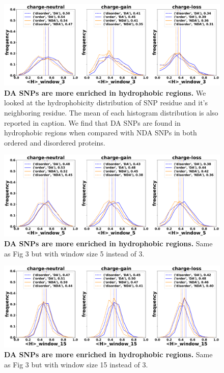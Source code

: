 \documentclass[10pt,letterpaper]{article}
\begin{document}
\begin{figure}[!ht]
\includegraphics[scale=0.1,width=\textwidth,trim={0 0cm 0 0cm},clip]{./figures/snp_hydropathy_distribution_3.pdf}
\caption{{\bf DA SNPs are more enriched in hydrophobic regions.} We looked at the hydrophobicity distribution of SNP residue and it's neighboring residue. The mean of each histogram distribution is also reported in caption. We find that DA SNPs are found in hydrophobic regions when compared with NDA SNPs in both ordered and disordered proteins.}
\label{fig2} 
\end{figure}

\begin{figure}[!ht]
\includegraphics[scale=0.1,width=1\textwidth,trim={0 0cm 0 0cm},clip]{./figures/snp_hydropathy_distribution_5.pdf}
\caption{{\bf DA SNPs are more enriched in hydrophobic regions.} Same as Fig 3 but with window size 5 instead of 3. }
\label{fig3} 
\end{figure}

\begin{figure}[!ht]
\includegraphics[scale=0.1,width=\textwidth,trim={0 0cm 0 0cm},clip]{./figures/snp_hydropathy_distribution_15.pdf}
\caption{{\bf DA SNPs are more enriched in hydrophobic regions.} Same as Fig 3 but with window size 15 instead of 3. }
\label{fig4} 
\end{figure}
\end{document}
